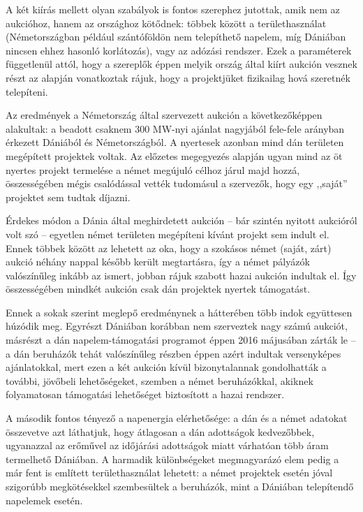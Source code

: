 \documentclass[twoside, magyar, showtrims]{corvinusphd}
\theoremstyle{plain}
\theoremstyle{remark}
\theoremstyle{definition}
\begin{document}
A két kiírás mellett olyan szabályok is fontos szerephez jutottak,
amik nem az aukcióhoz, hanem az országhoz kötődnek: többek között
a területhasználat (Németországban például szántóföldön nem telepíthető
napelem, míg Dániában nincsen ehhez hasonló korlátozás), vagy
az adózási rendszer. Ezek a paraméterek függetlenül attól, hogy
a szereplők éppen melyik ország által kiírt aukción vesznek részt
az alapján vonatkoztak rájuk, hogy a projektjüket fizikailag hová szeretnék telepíteni.

Az eredmények a Németország által szervezett aukción a következőképpen alakultak:
a beadott csaknem 300 MW-nyi ajánlat nagyjából fele-fele arányban érkezett
Dániából és Németországból. A nyertesek azonban mind dán területen
megépített projektek voltak. Az előzetes megegyezés alapján ugyan
mind az öt nyertes projekt termelése a német megújuló célhoz járul
majd hozzá, összességében mégis csalódással vették tudomásul a szervezők,
hogy egy ,,saját'' projektet sem tudtak díjazni.

Érdekes módon a Dánia által meghirdetett aukción -- bár szintén nyitott
aukcióról volt szó -- egyetlen német területen megépíteni kívánt projekt
sem indult el. Ennek többek között az lehetett az oka, hogy a szokásos
német (saját, zárt) aukció néhány nappal később került megtartásra,
így a német pályázók valószínűleg inkább az ismert, jobban rájuk
szabott hazai aukción indultak el. Így összességében mindkét aukción csak dán
projektek nyertek támogatást. 

Ennek a sokak szerint meglepő eredménynek a hátterében több 
indok együttesen húzódik meg. Egyrészt Dániában korábban nem szerveztek 
nagy számú aukciót, másrészt a dán napelem-támogatási
programot éppen 2016 májusában zárták le -- a dán beruházók
tehát valószínűleg részben éppen azért indultak versenyképes ajánlatokkal,
mert ezen a két aukción kívül bizonytalannak gondolhatták a további,
jövőbeli lehetőségeket, szemben a német beruházókkal, akiknek folyamatosan
támogatási lehetőséget biztosított a hazai rendszer.

A második fontos tényező a napenergia elérhetősége:
a dán és a német adatokat összevetve azt láthatjuk,
hogy átlagosan a dán adottságok kedvezőbbek, ugyanazzal az erőművel
az időjárási adottságok miatt várhatóan több áram termelhető Dániában.
A harmadik különbségeket megmagyarázó elem pedig a már fent is említett
területhasználat lehetett: a német projektek esetén jóval szigorúbb 
megkötésekkel szembesültek a beruházók, mint a Dániában telepítendő napelemek esetén.
\end{document}
